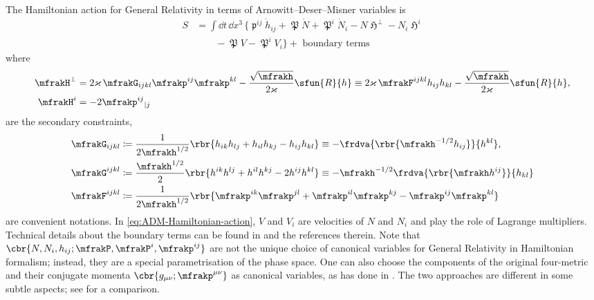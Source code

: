 \documentclass[a4paper,11pt]{article}
\begin{document}
The Hamiltonian action for General Relativity in terms 
of Arnowitt--Deser--Misner variables is \cite[ch.4.2.2]{Kiefer2012}
\begin{align}
S &=
\int\dd t\,\dd x^3\,\Big\{
\mfrakp^{ij}\dot{h}_{ij} + \mfrakP\dot{N} + \mfrakP^i \dot{N}_i
-N\mfrakH^\perp - N_i\mfrakH^i
\nonumber \\
&\qquad
- \mfrakP V - \mfrakP^i V_i\Big\} + \text{ boundary terms}
\label{eq:ADM-Hamiltonian-action}
\end{align}
where
\begin{align}
\mfrakH^\perp &=
2 \varkappa\,\mfrakG_{ijkl} \mfrakp^{ij}\mfrakp^{kl}
- \frac{\sqrt{\mfrakh}}{2\varkappa} \sfun{R}{h}
\equiv
2 \varkappa\,\mfrakF^{ijkl} h_{ij}h_{kl}
- \frac{\sqrt{\mfrakh}}{2\varkappa} \sfun{R}{h},
\\
\mfrakH^i &=
-2 \mfrakp^{ij}{}_{|j}
\end{align}
are the secondary constraints,
\begin{align}
\mfrakG_{ijkl} &\coloneqq \frac{1}{2\mfrakh^{1/2}}
\rbr{h_{ik}h_{lj}+h_{il}h_{kj}-h_{ij}h_{kl}}
\equiv -\frdva{\rbr{\mfrakh^{-1/2}h_{ij}}}{h^{kl}},\\
\mfrakG^{ijkl} &\coloneqq \frac{\mfrakh^{1/2}}{2}
\rbr{h^{ik}h^{lj}+h^{il}h^{kj}-2h^{ij}h^{kl}}
\equiv -\mfrakh^{-1/2}\frdva{\rbr{\mfrakh h^{ij}}}{h_{kl}}\\
\mfrakF^{ijkl} &\coloneqq \frac{1}{2\mfrakh^{1/2}}
\rbr{\mfrakp^{ik}\mfrakp^{jl}+\mfrakp^{il}\mfrakp^{kj}
-\mfrakp^{ij}\mfrakp^{kl}}
\end{align}
are convenient notations. In \cref{eq:ADM-Hamiltonian-action}, $V$ and $V_i$ are 
velocities of $N$ and $N_i$ and play the role of Lagrange multipliers. Technical 
details about the boundary terms can be found in \cite[ch.\ 4.2]{Poisson2004} 
and the references therein. Note that $\cbr{N, N_i, h_{ij}; \mfrakP, \mfrakP^i, 
\mfrakp^{ij}}$ are not the unique choice of canonical variables for General 
Relativity in Hamiltonian formalism; instead, they are a special parametrisation 
of the phase space. One can also choose the components of the original 
four-metric and their conjugate momenta $\cbr{g_{\mu\nu}; \mfrakp^{\mu\nu}}$ as 
canonical variables, as \citeauthor{Dirac1958} has done in \cite{Dirac1958}. The 
two approaches are different in some subtle aspects; see \cite{Kiriushcheva2008} 
for a comparison.
\end{document}
